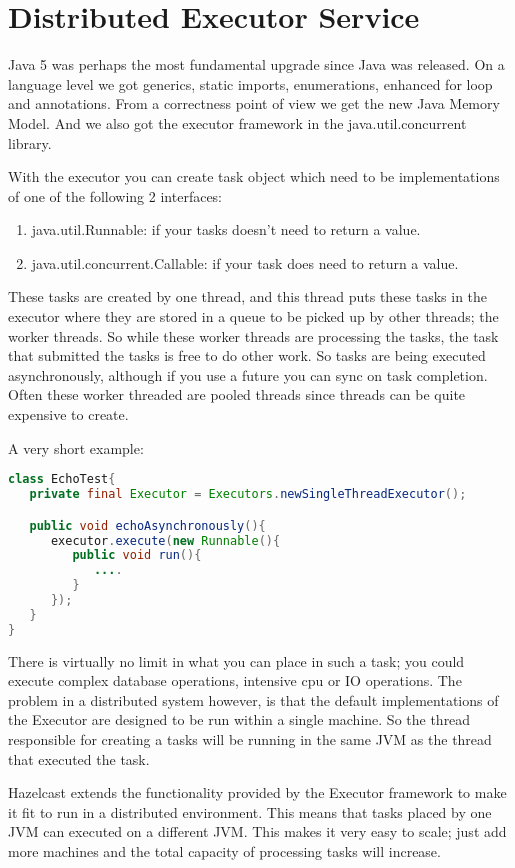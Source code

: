 \chapter{Distributed Executor Service}

Java 5 was perhaps the most fundamental upgrade since Java was released. On a language level we got generics, static imports, enumerations, enhanced for loop and annotations. From a correctness point of view we get the new Java Memory Model. And we also got the executor framework in the java.util.concurrent library.

With the executor you can create task object which need to be implementations of one of the following
2 interfaces:
\begin{enumerate}
\item java.util.Runnable: if your tasks doesn't need to return a value.
\item java.util.concurrent.Callable: if your task does need to return a value.
\end{enumerate}
These tasks are created by one thread, and this thread puts these tasks in the executor where they are
stored in a queue to be picked up by other threads; the worker threads. So while these worker threads are processing the tasks, the task that submitted the tasks is free to do other work. So tasks are being executed asynchronously, although if you use a future you can sync on task completion. Often these worker threaded are pooled threads since threads can be quite expensive to create. 

A very short example:
\begin{lstlisting}[language=java]
class EchoTest{
   private final Executor = Executors.newSingleThreadExecutor();

   public void echoAsynchronously(){
      executor.execute(new Runnable(){
         public void run(){
            ....
         }
      });	
   }
}
\end{lstlisting}

There is virtually no limit in what you can place in such a task; you could execute complex database operations, intensive cpu or IO operations. The problem in a distributed system however, is that the default implementations of the Executor are designed to be run within a single machine. So the thread responsible for creating a tasks will be running in the same JVM as the thread that executed the task.

Hazelcast extends the functionality provided by the Executor framework to make it fit to run in a distributed environment. This means that tasks placed by one JVM can executed on a different JVM. This makes it very easy to scale; just add more machines and the total capacity of processing tasks will increase.

